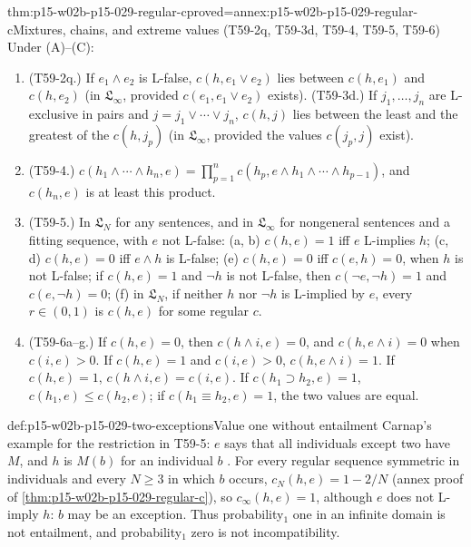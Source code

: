 \begin{hbtheorem}{thm:p15-w02b-p15-029-regular-c}{proved=annex:p15-w02b-p15-029-regular-c}{Mixtures, chains, and extreme values (T59-2q, T59-3d, T59-4, T59-5, T59-6)}
Under (A)--(C):
\begin{enumerate}
 \item (T59-2q.) If \(e_1\land e_2\) is L-false, \(c(h,e_1\lor e_2)\)
       lies between \(c(h,e_1)\) and \(c(h,e_2)\) (in
       \(\mathfrak L_\infty\), provided \(c(e_1,e_1\lor e_2)\) exists).
       (T59-3d.) If \(j_1,\ldots,j_n\) are L-exclusive in pairs and
       \(j=j_1\lor\cdots\lor j_n\), \(c(h,j)\) lies between the least
       and the greatest of the \(c(h,j_p)\) (in \(\mathfrak L_\infty\),
       provided the values \(c(j_p,j)\) exist).
 \item (T59-4.) \(c(h_1\land\cdots\land h_n,e)
       =\prod_{p=1}^nc(h_p,e\land h_1\land\cdots\land h_{p-1})\), and
       \(c(h_n,e)\) is at least this product.
 \item (T59-5.) In \(\mathfrak L_N\) for any sentences, and in
       \(\mathfrak L_\infty\) for nongeneral sentences and a fitting
       sequence, with \(e\) not L-false: (a, b) \(c(h,e)=1\) iff
       \(e\) L-implies \(h\); (c, d) \(c(h,e)=0\) iff \(e\land h\) is
       L-false; (e) \(c(h,e)=0\) iff \(c(e,h)=0\), when \(h\) is not
       L-false; if \(c(h,e)=1\) and \(\neg h\) is not L-false, then
       \(c(\neg e,\neg h)=1\) and \(c(e,\neg h)=0\); (f) in
       \(\mathfrak L_N\), if neither \(h\) nor \(\neg h\) is
       L-implied by \(e\), every \(r\in(0,1)\) is \(c(h,e)\) for some
       regular \(c\).
 \item (T59-6a--g.) If \(c(h,e)=0\), then \(c(h\land i,e)=0\), and
       \(c(h,e\land i)=0\) when \(c(i,e)>0\). If \(c(h,e)=1\) and
       \(c(i,e)>0\), \(c(h,e\land i)=1\). If \(c(h,e)=1\),
       \(c(h\land i,e)=c(i,e)\). If \(c(h_1\supset h_2,e)=1\),
       \(c(h_1,e)\leq c(h_2,e)\); if \(c(h_1\equiv h_2,e)=1\), the two
       values are equal.
\end{enumerate}
\end{hbtheorem}

\begin{hbexample}{def:p15-w02b-p15-029-two-exceptions}{Value one without entailment}
Carnap's example for the restriction in T59-5: \(e\) says that all
individuals except two have \(M\), and \(h\) is \(M(b)\) for an
individual \(b\) \cite[sec.~59, p.~322]{Carnap1950Probability}. For
every regular sequence symmetric in individuals and every
\(N\geq3\) in which \(b\) occurs, \(c_N(h,e)=1-2/N\) (annex proof of
\cref{thm:p15-w02b-p15-029-regular-c}), so \(c_\infty(h,e)=1\),
although \(e\) does not L-imply \(h\): \(b\) may be an exception. Thus
probability\(_1\) one in an infinite domain is not entailment, and
probability\(_1\) zero is not incompatibility.
\end{hbexample}

